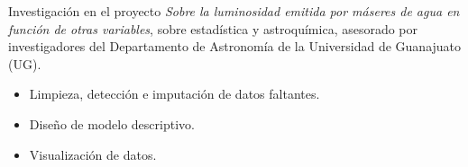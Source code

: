 \documentclass[]{friggeri-cv}
\begin{document}
\begin{entrylist}
{\begin{tabular}{r}
	\end{tabular}\hspace{0.4cm}
    }
    {\vspace{-0.98cm}}
    { }
    {Investigación en el proyecto \textsl{Sobre la luminosidad emitida por máseres de agua en función de otras variables}, sobre estadística y astroquímica, asesorado por investigadores del Departamento de Astronomía de la Universidad de Guanajuato (UG).
    \begin{itemize}
	\item Limpieza, detección e imputación de datos faltantes.
	\item Diseño de modelo descriptivo.
	\item Visualización de datos.
\end{itemize}}%
\end{entrylist}
\vspace{-0.65cm}
\end{document}

